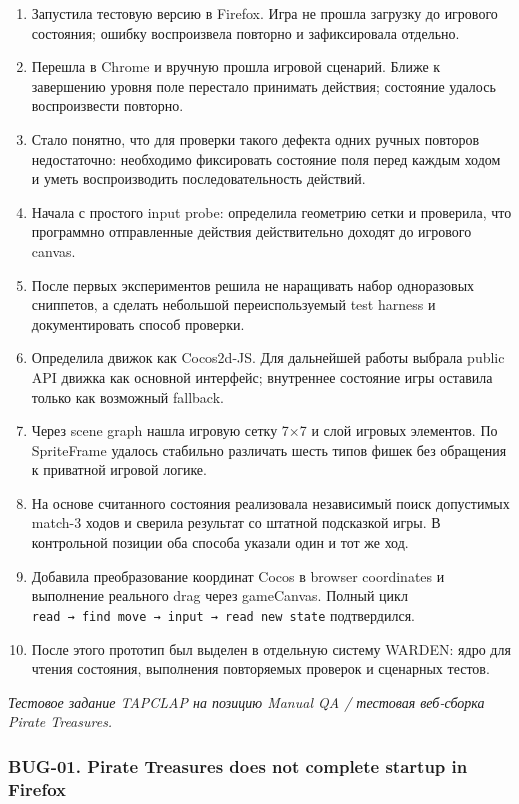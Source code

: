 \documentclass{ZGJournalArticle_2026}
\providecommand{\tightlist}{%
  \setlength{\itemsep}{0pt}\setlength{\parskip}{0pt}}
\begin{document}
\begin{enumerate}
\def\labelenumi{\arabic{enumi}.}
\tightlist
\item
  Запустила тестовую версию в Firefox. Игра не прошла загрузку до
  игрового состояния; ошибку воспроизвела повторно и зафиксировала
  отдельно.
\item
  Перешла в Chrome и вручную прошла игровой сценарий. Ближе к завершению
  уровня поле перестало принимать действия; состояние удалось
  воспроизвести повторно.
\item
  Стало понятно, что для проверки такого дефекта одних ручных повторов
  недостаточно: необходимо фиксировать состояние поля перед каждым ходом
  и уметь воспроизводить последовательность действий.
\item
  Начала с простого input probe: определила геометрию сетки и проверила,
  что программно отправленные действия действительно доходят до игрового
  canvas.
\item
  После первых экспериментов решила не наращивать набор одноразовых
  сниппетов, а сделать небольшой переиспользуемый test harness и
  документировать способ проверки.
\item
  Определила движок как Cocos2d-JS. Для дальнейшей работы выбрала public
  API движка как основной интерфейс; внутреннее состояние игры оставила
  только как возможный fallback.
\item
  Через scene graph нашла игровую сетку 7×7 и слой игровых элементов. По
  SpriteFrame удалось стабильно различать шесть типов фишек без
  обращения к приватной игровой логике.
\item
  На основе считанного состояния реализовала независимый поиск
  допустимых match-3 ходов и сверила результат со штатной подсказкой
  игры. В контрольной позиции оба способа указали один и тот же ход.
\item
  Добавила преобразование координат Cocos в browser coordinates и
  выполнение реального drag через gameCanvas. Полный цикл
  \texttt{read\ →\ find\ move\ →\ input\ →\ read\ new\ state}
  подтвердился.
\item
  После этого прототип был выделен в отдельную систему WARDEN: ядро для
  чтения состояния, выполнения повторяемых проверок и сценарных тестов.
\end{enumerate}

\newpage

\emph{Тестовое задание TAPCLAP на позицию Manual QA / тестовая
веб-сборка Pirate Treasures.}

\subsubsection{BUG-01. Pirate Treasures does not complete startup in
Firefox}\label{bug-01.-pirate-treasures-does-not-complete-startup-in-firefox}
\end{document}
